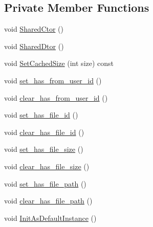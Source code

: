 \subsection*{Private Member Functions}
\begin{DoxyCompactItemize}
\item 
void \hyperlink{class_i_m_1_1_base_define_1_1_server_offline_file_info_acb20229b5fac52b3d36945e66ee768b8}{Shared\+Ctor} ()
\item 
void \hyperlink{class_i_m_1_1_base_define_1_1_server_offline_file_info_a5883580e4f2f446a4bb21e5ab6463040}{Shared\+Dtor} ()
\item 
void \hyperlink{class_i_m_1_1_base_define_1_1_server_offline_file_info_a9f30b7ba508b059a959280110b93c017}{Set\+Cached\+Size} (int size) const 
\item 
void \hyperlink{class_i_m_1_1_base_define_1_1_server_offline_file_info_a1d4ce12f12577ac7c881c8b6ce5fcd8e}{set\+\_\+has\+\_\+from\+\_\+user\+\_\+id} ()
\item 
void \hyperlink{class_i_m_1_1_base_define_1_1_server_offline_file_info_a2b3ce73b9e701c8c71a5d2c2da0f367c}{clear\+\_\+has\+\_\+from\+\_\+user\+\_\+id} ()
\item 
void \hyperlink{class_i_m_1_1_base_define_1_1_server_offline_file_info_a5c91f9a9a8e55763d15b0e1f9832743f}{set\+\_\+has\+\_\+file\+\_\+id} ()
\item 
void \hyperlink{class_i_m_1_1_base_define_1_1_server_offline_file_info_abc5a97c6f2f10d381e98007bb4dfa3b6}{clear\+\_\+has\+\_\+file\+\_\+id} ()
\item 
void \hyperlink{class_i_m_1_1_base_define_1_1_server_offline_file_info_a0c735ca07afd69b9adb0c4e899e4f0ef}{set\+\_\+has\+\_\+file\+\_\+size} ()
\item 
void \hyperlink{class_i_m_1_1_base_define_1_1_server_offline_file_info_ab6f30ed4304fa8b7fa144329d9cfca04}{clear\+\_\+has\+\_\+file\+\_\+size} ()
\item 
void \hyperlink{class_i_m_1_1_base_define_1_1_server_offline_file_info_af72c7f3d8fd217e52bd02153344eb59c}{set\+\_\+has\+\_\+file\+\_\+path} ()
\item 
void \hyperlink{class_i_m_1_1_base_define_1_1_server_offline_file_info_a8370eed03eb187cdb8d89e646d57db73}{clear\+\_\+has\+\_\+file\+\_\+path} ()
\item 
void \hyperlink{class_i_m_1_1_base_define_1_1_server_offline_file_info_ae979c6a4fa2d3dae9caaf8e99e52fe47}{Init\+As\+Default\+Instance} ()
\end{DoxyCompactItemize}
